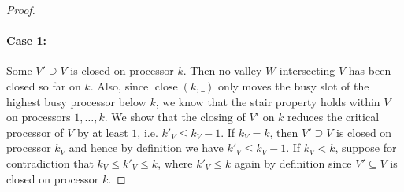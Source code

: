 \documentclass[a4paper]{article}
\DeclareMathOperator{\close}{close}
\begin{document}
\begin{proof}
  \paragraph{Case 1:}
      Some $V' \supseteq V$ is closed on processor $k$.
      Then no valley $W$ intersecting $V$ has been closed so far on $k$.
      Also, since $\close(k, \_)$ only moves the busy slot of the highest busy processor below $k$, we know that the stair property  holds within $V$ on processors $1, \ldots, k$.
      We show that the closing of $V'$ on $k$ reduces the critical processor of $V$ by at least $1$, i.e. $k'_V \leq k_V - 1$.
      If $k_V = k$, then $V' \supseteq V$ is closed on processor $k_V$ and hence by definition we have $k'_V \leq k_V - 1$.
      If $k_V < k$, suppose for contradiction that $k_V \leq k'_V \leq k$, where $k'_V \leq k$ again by definition since $V' \subseteq V$ is closed on processor $k$.


\end{proof}
\end{document}
